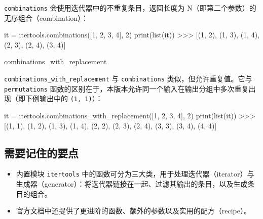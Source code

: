 \texttt{combinations} 会使用迭代器中的不重复条目，返回长度为 N（即第二个参数）的无序组合（combination）：

\begin{codebox}[python]
it = itertools.combinations([1, 2, 3, 4], 2)
print(list(it))
>>>
[(1, 2), (1, 3), (1, 4), (2, 3), (2, 4), (3, 4)]
\end{codebox}

\begin{codebox}[python]
combinations_with_replacement
\end{codebox}

\texttt{combinations\_with\_replacement} 与 \texttt{combinations} 类似，但允许重复值。它与 \texttt{permutations} 函数的区别在于，本版本允许同一个输入在输出分组中多次重复出现（即下例输出中的 \texttt{(1, 1)}）：

\begin{codebox}[python]
it = itertools.combinations_with_replacement([1, 2, 3, 4], 2)
print(list(it))
>>>
[(1, 1),
 (1, 2),
 (1, 3),
 (1, 4),
 (2, 2),
 (2, 3),
 (2, 4),
 (3, 3),
 (3, 4),
 (4, 4)]
\end{codebox}

\subsection{需要记住的要点}

\begin{itemize}
\item 内置模块 \texttt{itertools} 中的函数可分为三大类，用于处理迭代器（iterator）与生成器（generator）：将迭代器链接在一起、过滤其输出的条目，以及生成条目的组合。
\item 官方文档中还提供了更进阶的函数、额外的参数以及实用的配方（recipe）。
\end{itemize}
